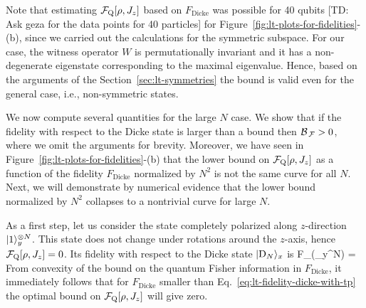 Note that estimating $\mathcal{F}_{\textnormal{Q}}[{\textstyle \rho, J_z}]$ based on $F_{\text{Dicke}}$ was possible for 40 qubits [TD: Ask geza for the data points for 40 particles] for Figure~\ref{fig:lt-plots-for-fidelities}-(b), since we carried out the calculations for the symmetric subspace.
For our case, the witness operator $W$ is permutationally invariant and it has a non-degenerate eigenstate corresponding to the maximal eigenvalue.
Hence, based on the arguments of the Section~\ref{sec:lt-symmetries} the bound is valid even for the general case, i.e., non-symmetric states.

We now compute several quantities for the large $N$ case.
We show that if the fidelity with respect to the Dicke state is larger than a bound then $\mathcal{B}_{\, \mathcal{F} }>0$, where we omit the arguments for brevity.
Moreover, we have seen in Figure~\ref{fig:lt-plots-for-fidelities}-(b) that the lower bound on $\mathcal{F}_{\textnormal{Q}}[{\textstyle \rho,J_z}]$ as a function of the fidelity $F_{\text{Dicke}}$ normalized by $N^2$ is not the same curve for all $N$.
Next, we will demonstrate by numerical evidence that the lower bound normalized by $N^2$ collapses to a nontrivial curve for large $N$.

As a first step, let us consider the state completely polarized along $z$-direction $\vert{1}\rangle_y^{\otimes N}$.
This state does not change under rotations around the $z$-axis, hence $\mathcal{F}_{\textnormal{Q}}[{\textstyle \rho,J_z}]=0$.
Its fidelity with respect to the Dicke state $\vert{\ensuremath{\textnormal{D}_{N}}}\rangle_x$ is
\be
  \label{eq:lt-fidelity-dicke-with-tp}
  F_{}(_y^{\otimes N}) = \approx {}
\ee
From convexity of the bound on the quantum Fisher information in $F_{\text{Dicke}}$, it immediately follows that for $F_{\text{Dicke}}$ smaller than Eq.~\eqref{eq:lt-fidelity-dicke-with-tp} the optimal bound on $\mathcal{F}_{\textnormal{Q}}[{\textstyle \rho,J_z}]$ will give zero.

